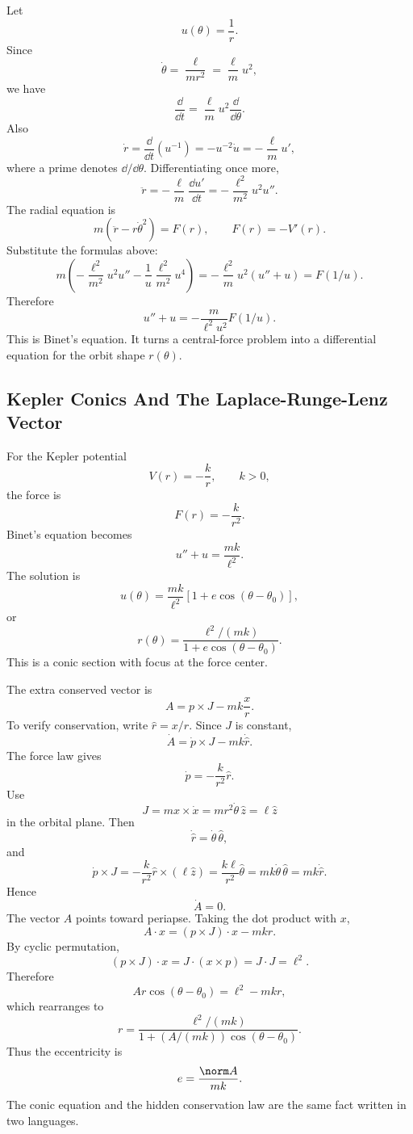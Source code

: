 Let
\[
  u(\theta)=\frac1r.
\]
Since
\[
  \dot\theta=\frac{\ell}{mr^2}=\frac{\ell}{m}u^2,
\]
we have
\[
  \frac{\dd}{\dd t}
  =
  \frac{\ell}{m}u^2\frac{\dd}{\dd\theta}.
\]
Also
\[
  \dot r
  =
  \frac{\dd}{\dd t}(u^{-1})
  =
  -u^{-2}\dot u
  =
  -\frac{\ell}{m}u',
\]
where a prime denotes \(\dd/\dd\theta\). Differentiating once more,
\[
  \ddot r
  =
  -\frac{\ell}{m}\frac{\dd u'}{\dd t}
  =
  -\frac{\ell^2}{m^2}u^2u''.
\]
The radial equation is
\[
  m(\ddot r-r\dot\theta^2)=F(r),
  \qquad
  F(r)=-V'(r).
\]
Substitute the formulas above:
\[
  m\left(
    -\frac{\ell^2}{m^2}u^2u''
    -
    \frac1u\frac{\ell^2}{m^2}u^4
  \right)
  =
  -\frac{\ell^2}{m}u^2(u''+u)
  =
  F(1/u).
\]
Therefore
\[
  \boxed{
  u''+u
  =
  -\frac{m}{\ell^2u^2}F(1/u).
  }
\]
This is Binet's equation. It turns a central-force problem into a differential
equation for the orbit shape \(r(\theta)\).

\subsection{Kepler Conics And The Laplace-Runge-Lenz Vector}
\label{subsec:detailed-kepler-lrl}

For the Kepler potential
\[
  V(r)=-\frac{k}{r},
  \qquad
  k>0,
\]
the force is
\[
  F(r)=-\frac{k}{r^2}.
\]
Binet's equation becomes
\[
  u''+u=\frac{mk}{\ell^2}.
\]
The solution is
\[
  u(\theta)=\frac{mk}{\ell^2}\left[1+e\cos(\theta-\theta_0)\right],
\]
or
\[
  r(\theta)=\frac{\ell^2/(mk)}
  {1+e\cos(\theta-\theta_0)}.
\]
This is a conic section with focus at the force center.

The extra conserved vector is
\[
  A=p\times J-mk\frac{x}{r}.
\]
To verify conservation, write \(\hat r=x/r\). Since \(J\) is constant,
\[
  \dot A=\dot p\times J-mk\dot{\hat r}.
\]
The force law gives
\[
  \dot p=-\frac{k}{r^2}\hat r.
\]
Use
\[
  J=mx\times\dot x=mr^2\dot\theta\,\hat z=\ell\hat z
\]
in the orbital plane. Then
\[
  \dot{\hat r}=\dot\theta\,\hat\theta,
\]
and
\[
  \dot p\times J
  =
  -\frac{k}{r^2}\hat r\times(\ell\hat z)
  =
  \frac{k\ell}{r^2}\hat\theta
  =
  mk\dot\theta\,\hat\theta
  =
  mk\dot{\hat r}.
\]
Hence
\[
  \dot A=0.
\]
The vector \(A\) points toward periapse. Taking the dot product with \(x\),
\[
  A\cdot x
  =
  (p\times J)\cdot x-mkr.
\]
By cyclic permutation,
\[
  (p\times J)\cdot x=J\cdot(x\times p)=J\cdot J=\ell^2.
\]
Therefore
\[
  A r\cos(\theta-\theta_0)=\ell^2-mkr,
\]
which rearranges to
\[
  r=\frac{\ell^2/(mk)}{1+(A/(mk))\cos(\theta-\theta_0)}.
\]
Thus the eccentricity is
\[
  e=\frac{\norm A}{mk}.
\]
The conic equation and the hidden conservation law are the same fact written
in two languages.

